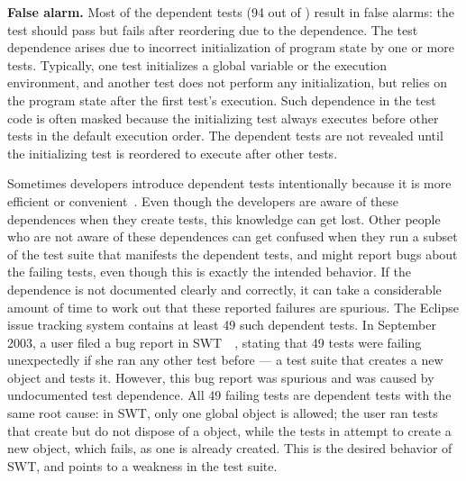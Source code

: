 \noindent \textbf{False alarm.} Most of
the dependent tests (94 out of \dtnum) 
result in false alarms:
the test should pass but fails after reordering due to the dependence.
The test dependence arises due to incorrect initialization
of program state by one
or more tests. Typically, one test initializes
a global variable or the execution environment, and another
test does not perform any initialization, but
relies on the program state after the first test's execution.
Such dependence in the test code is often masked because
the initializing test always executes before other tests in the
default execution order. The dependent tests are not revealed
until the initializing test is reordered to execute
after other tests. 


Sometimes developers introduce dependent tests intentionally because it is
more efficient or convenient~\cite{kapfhammeretal:FSE:2003, whittakeretal:2012}.
Even though the developers are aware of these dependences
when they create tests, this knowledge can get lost.
Other people who are not aware of these dependences can get confused 
when they run a subset of the test suite that manifests the
dependent tests, and might report bugs about the failing tests,
even though this is exactly the intended behavior. 
If the dependence is not documented clearly and
correctly, it can take a considerable amount of time to work out that
these reported failures are spurious. 
The Eclipse issue tracking system contains at least
49 such dependent tests.
In September 2003, a user filed a
bug report in SWT~\cite{swt}~\cite{eclipsebug},
stating that 49 tests were failing unexpectedly
if she ran any other test before  --- 
a test suite that creates a new  object and tests it.
However, this bug report was spurious and was
caused by undocumented test dependence.
All 49 failing tests are dependent tests with the same
root cause: in SWT, only one global 
object is allowed; the user ran tests that
create but do not dispose of a  object, while
the tests in  attempt to create
a new  object, which fails, as one
is already created. This is the desired behavior of SWT,
and points to a weakness in the test suite.

